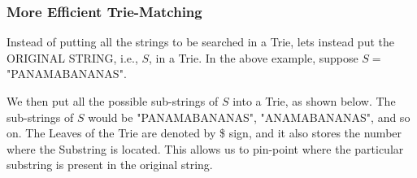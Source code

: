 \documentclass{article}
\theoremstyle{definition}
\theoremstyle{example}
\begin{document}
\subsubsection{\Large More Efficient Trie-Matching}
\hspace{4mm} 
Instead of putting all the strings to be searched in a Trie, lets instead put the ORIGINAL STRING, i.e., $S$, in a Trie. In the above example, suppose $S =$ "PANAMABANANAS".\par
\vspace{4mm}
We then put all the possible sub-strings of $S$ into a Trie, as shown below. The sub-strings of $S$ would be "PANAMABANANAS", "ANAMABANANAS", and so on. The Leaves of the Trie are denoted by \$ sign, and it also stores the number where the Substring is located. This allows us to pin-point where the particular substring is present in the original string. \par
\end{document}
